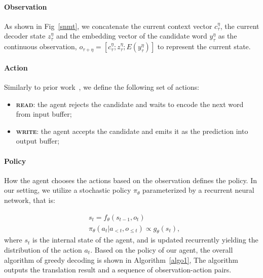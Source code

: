 \paragraph{Observation} As shown in Fig~\ref{snmt}, we concatenate the current context vector $c_{\tau}^{\eta}$, the current decoder state $z_{\tau}^{\eta}$ and the embedding vector of the candidate word $y_{\tau}^{\eta}$ as the continuous observation, $o_{\tau+\eta}=\left[c_{\tau}^{\eta}; z_{\tau}^{\eta}; E(y_{\tau}^{\eta})\right]$ to represent the current state.%

\paragraph{Action} Similarly to prior work~\cite{grissomii2014don}, we define the following set of actions:
\begin{itemize}[leftmargin=*]
	\itemsep -0.4em
    \item \textbf{\textsc{read}}: the agent rejects the candidate and waits to encode the next word from input buffer;
    \item \textbf{\textsc{write}}: the agent accepts the candidate and emits it as the prediction into output buffer;
\end{itemize}

\paragraph{Policy} How the agent chooses the actions based on the observation defines the policy. In our setting, we utilize a stochastic policy $\pi_{\theta}$ parameterized by a recurrent neural network, that is:

\begin{equation}
    \begin{split}
        &s_t = f_{\theta}\left(s_{t-1}, o_t\right)\\
        &\pi_{\theta}(a_t|a_{<t}, o_{\leq t}) \propto g_{\theta}\left(s_t\right), 
    \end{split}
\end{equation}
where $s_t$ is the internal state of the agent, and is updated recurrently yielding the distribution of the action $a_t$. 
Based on the policy of our agent, the overall algorithm of greedy decoding is shown in Algorithm~\ref{algo1}, %
The algorithm outputs the translation result and a sequence of observation-action pairs.


